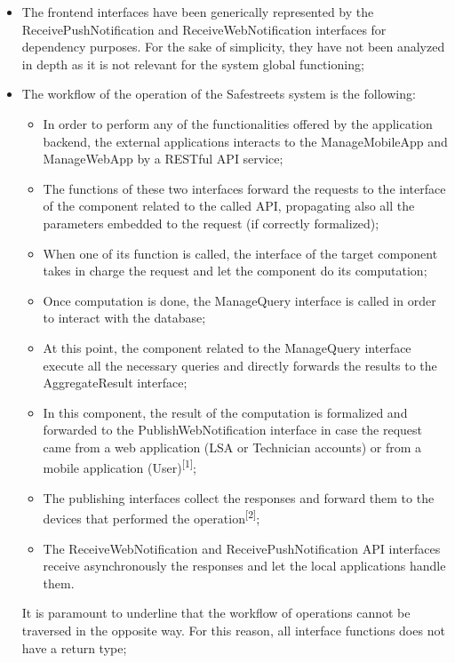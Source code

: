 \begin{itemize}
    \item The frontend interfaces have been generically represented by the ReceivePushNotification and ReceiveWebNotification interfaces for dependency purposes. For the sake of simplicity, they have not been analyzed in depth as it is not relevant for the system global functioning;
    \item The workflow of the operation of the Safestreets system is the following:
        \begin{itemize}
            \item In order to perform any of the functionalities offered by the application backend, the external applications interacts to the ManageMobileApp and ManageWebApp by a RESTful API service;
            \item The functions of these two interfaces forward the requests to the interface of the component related to the called API, propagating also all the parameters embedded to the request (if correctly formalized);
            \item When one of its function is called, the interface of the target component takes in charge the request and let the component do its computation;
            \item Once computation is done, the ManageQuery interface is called in order to interact with the database;
            \item At this point, the component related to the ManageQuery interface execute all the necessary queries and directly forwards the results to the AggregateResult interface;
            \item In this component, the result of the computation is formalized and forwarded to the PublishWebNotification interface in case the request came from a web application (LSA or Technician accounts) or from a mobile application (User)\textsuperscript{[1]};
            \item The publishing interfaces collect the responses and forward them to the devices that performed the operation\textsuperscript{[2]};
            \item The ReceiveWebNotification and ReceivePushNotification API interfaces receive asynchronously the responses and let the local applications handle them.
        \end{itemize}
    It is paramount to underline that the workflow of operations cannot be traversed in the opposite way. For this reason, all interface functions does not have a return type;

\end{itemize}
